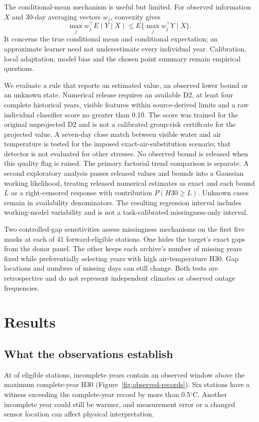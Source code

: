 \documentclass[draft,linenumbers]{agujournal2025}
\begin{document}
The conditional-mean mechanism is useful but limited. For observed information $X$ and 30-day averaging vectors $w_j$, convexity gives
\[
 \max_j w_j^\top E(Y\mid X)\le E\{\max_j w_j^\top Y\mid X\}.
\]
It concerns the true conditional mean and conditional expectation; an approximate learner need not underestimate every individual year. Calibration, local adaptation, model bias and the chosen point summary remain empirical questions.

We evaluate a rule that reports an estimated value, an observed lower bound or an unknown state. Numerical release requires an available D2, at least four complete historical years, visible features within source-derived limits and a raw individual classifier score no greater than 0.10. The score was trained for the original unprojected D2 and is not a calibrated group-risk certificate for the projected value. A seven-day close match between visible water and air temperature is tested for the imposed exact-air-substitution scenario; that detector is not evaluated for other stresses. No observed bound is released when this quality flag is raised. The primary factorial trend comparison is separate. A second exploratory analysis passes released values and bounds into a Gaussian working likelihood, treating released numerical estimates as exact and each bound $L$ as a right-censored response with contribution $P(H30\ge L)$. Unknown cases remain in availability denominators. The resulting regression interval includes working-model variability and is not a task-calibrated missingness-only interval.





Two controlled-gap sensitivities assess missingness mechanisms on the first five masks at each of 41 forward-eligible stations. One hides the target's exact gaps from the donor panel. The other keeps each archive's number of missing years fixed while preferentially selecting years with high air-temperature H30. Gap locations and numbers of missing days can still change. Both tests are retrospective and do not represent independent climates or observed outage frequencies.

\section{Results}
\subsection{What the observations establish}

At \RRecordStations{} of \RRecordDenominator{} eligible stations, \RRecordStationYears{} incomplete years contain an observed window above the maximum complete-year H30 (Figure~\ref{fig:observed-records}). Six stations have a witness exceeding the complete-year record by more than 0.5$^{\circ}$C. Another incomplete year could still be warmer, and measurement error or a changed sensor location can affect physical interpretation.
\end{document}
